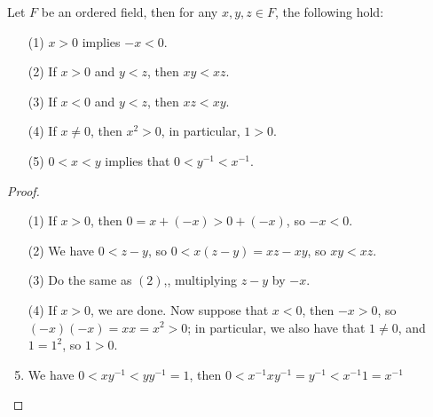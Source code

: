 \begin{proposition}\label{1.2.4}
    Let $F$ be an ordered field, then for any  $x,y,z \in F$, the following hold:
         \begin{enumerate}
             \item[(1)] $x>0$ implies $-x<0$.

             \item[(2)] If $x>0$  and $y<z$, then $xy<xz$.

             \item[(3)] If $x<0$  and $y<z$, then $xz<xy$.

             \item[(4)] If $x \neq 0$, then $x^2>0$, in particular, $1>0$.

             \item[(5)] $0<x<y$ implies that $0<y^{-1}<x^{-1}$.
        \end{enumerate}
\end{proposition}
\begin{proof}
    \begin{enumerate}
        \item[(1)] If $x>0$, then  $0=x+(-x)>0+(-x)$, so  $-x<0$.

        \item[(2)] We have $0<z-y$, so  $0<x(z-y)=xz-xy$, so $xy<xz$.

        \item[(3)] Do the same as  $(2)$,, multiplying  $z-y$ by  $-x$.

        \item[(4)] If  $x>0$, we are done. Now suppose that  $x<0$, then  $-x>0$, so
            $(-x)(-x)=xx=x^2>0$; in particular, we also have that  $1 \neq 0$, and
             $1=1^2$, so  $1>0$.

         \item We have  $0<xy^{-1}<yy^{-1}=1$, then  $0<x^{-1}xy^{-1}=y^{-1}<x^{-1}1=x^{-1}$
    \end{enumerate}
\end{proof}
